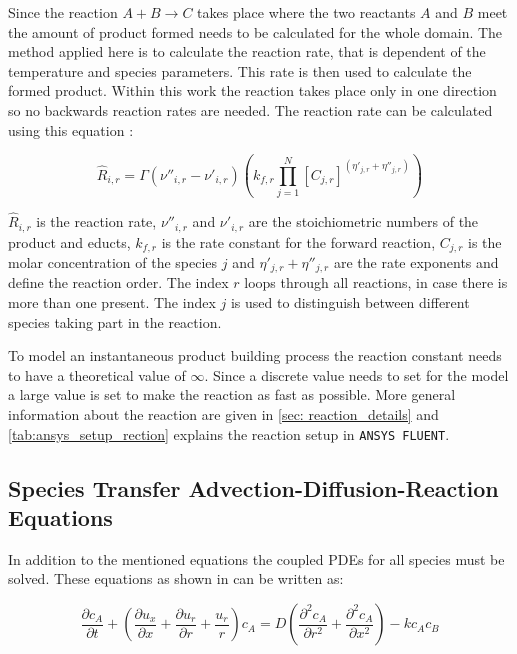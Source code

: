 \documentclass[../thesis.tex]{subfiles}
\begin{document}
Since the reaction $ A + B \rightarrow C$ takes place where the two reactants $A$ and $B$ meet the amount of product formed needs to be calculated for the whole domain. The method applied here is to calculate the reaction rate, that is dependent of the temperature and species parameters. This rate is then used to calculate the formed product. Within this work the reaction takes place only in one direction so no backwards reaction rates are needed. The reaction rate can be calculated using this equation \cite{manual2009ansys}:

\begin{equation}
\label{eqn:reaction}
\hat{R}_{i,r} = {\Gamma} \left(\nu''_{i,r} - \nu'_{i,r} \right) \left(k_{f,r} \prod_{j=1}^{N} \left[C_{j,r} \right]^{(\eta'_{j,r} + \eta''_{j,r})} \right) 
\end{equation}

$\hat{R}_{i,r}$ is the reaction rate, $\nu''_{i,r}$ and $\nu'_{i,r}$ are the stoichiometric numbers of the product and educts, $k_{f,r}$ is the rate constant for the forward reaction, $C_{j,r}$ is the molar concentration of the species $j$ and $\eta'_{j,r} + \eta''_{j,r}$ are the rate exponents and define the reaction order. 
The index $r$ loops through all reactions, in case there is more than one present. The index $j$ is used to distinguish between different species taking part in the reaction.

To model an instantaneous product building process the reaction constant needs to have a theoretical value of $\infty$. Since a discrete value needs to set for the model a large value is set to make the reaction as fast as possible. More general information about the reaction are given in \autoref{sec: reaction_details} and \autoref{tab:ansys_setup_rection} explains the reaction setup in \texttt{ANSYS FLUENT}. 

\subsection{Species Transfer Advection-Diffusion-Reaction Equations}

In addition to the mentioned equations the coupled PDEs for all species must be solved. These equations as shown in \cite{comolli2021dynamics} can be written as:

\begin{equation}
	\dfrac{\partial c_A}{\partial t} + \left( \dfrac{\partial u_x}{ \partial x} + \dfrac{\partial u_r}{ \partial r} + \dfrac{u_r}{r} \right) c_A = D \left( \dfrac{\partial^2 c_A} {\partial r^2} + \dfrac{\partial^2 c_A}{\partial x^2} \right)  - kc_A c_B
\end{equation}
\end{document}
